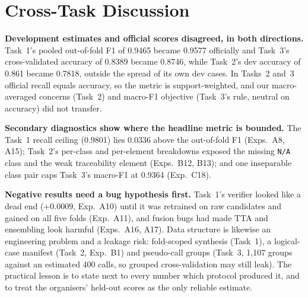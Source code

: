 \section{Cross-Task Discussion}
\label{sec:discussion}

\noindent\textbf{Development estimates and official scores disagreed, in both
directions.} Task~1's pooled out-of-fold F1 of 0.9465 became 0.9577 officially and
Task~3's cross-validated accuracy of 0.8389 became 0.8746, while Task~2's dev accuracy
of 0.861 became 0.7818, outside the spread of its own dev cases. In Tasks~2 and~3 official recall equals accuracy, so the
metric is support-weighted, and our macro-averaged concerns (Task~2) and macro-F1
objective (Task~3's rule, neutral on accuracy) did not transfer.

\noindent\textbf{Secondary diagnostics show where the headline metric is bounded.} The
Task~1 recall ceiling (0.9801) lies 0.0336 above the out-of-fold F1 (Exps.~A8, A15);
Task~2's per-class and per-element breakdowns exposed the missing \texttt{N/A} class
and the weak traceability element (Exps.~B12, B13); and one inseparable class pair caps
Task~3's macro-F1 at 0.9364 (Exp.~C18).

\noindent\textbf{Negative results need a bug hypothesis first.} Task~1's verifier
looked like a dead end ($+0.0009$, Exp.~A10) until it was retrained on raw candidates
and gained on all five folds (Exp.~A11), and fusion bugs had made TTA and ensembling
look harmful (Exps.~A16, A17). Data structure is likewise an engineering problem and a
leakage risk: fold-scoped synthesis (Task~1), a logical-case manifest (Task~2,
Exp.~B1) and pseudo-call groups (Task~3, 1{,}107 groups against an estimated 400 calls,
so grouped cross-validation may still leak).
The practical lesson is to state next to every number which protocol produced it,
and to treat the organisers' held-out scores as the only reliable estimate.
